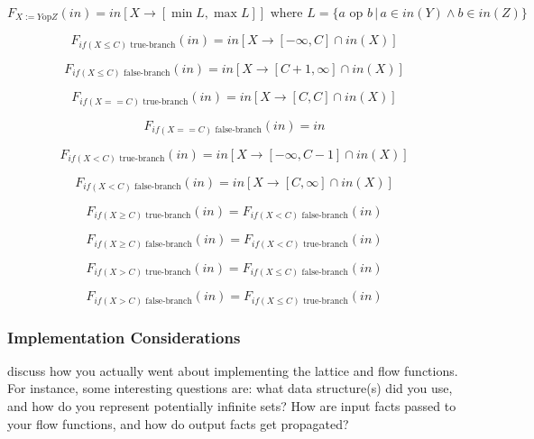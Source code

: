 \documentclass{article}
\theoremstyle{definition}
\begin{document}
\[ F_{X:= Y \text{op} Z}(in) = in[X \rightarrow [\min L, \max L]]\text{ where } L = \{ a \text{ op } b \, | \, a \in in(Y) \wedge b \in in(Z)  \}\]

\[ F_{if( X \leq C) \text{ true-branch}}(in) = in[X \rightarrow [-\infty, C] \cap in(X)  ] \]

\[ F_{if( X \leq C) \text{ false-branch}}(in) = in[X \rightarrow [C + 1, \infty] \cap in(X)  ]\]

\[ F_{if( X == C) \text{ true-branch}}(in) = in[X \rightarrow [C, C] \cap in(X)  ]\]

\[ F_{if( X == C) \text{ false-branch}}(in) = in \]

\[ F_{if( X < C) \text{ true-branch}}(in) =in[X \rightarrow [-\infty, C -1] \cap in(X)  ] \]

\[ F_{if( X < C) \text{ false-branch}}(in) =  in[X \rightarrow [C, \infty] \cap in(X)  ]\]

\[ F_{if( X \geq C) \text{ true-branch}}(in) =  F_{if( X < C) \text{ false-branch}}(in) \]

\[ F_{if( X \geq C) \text{ false-branch}}(in) =  F_{if( X < C) \text{ true-branch}}(in)\]

\[ F_{if( X > C) \text{ true-branch}}(in) =   F_{if( X \leq C) \text{ false-branch}}(in)\]

\[ F_{if( X > C) \text{ false-branch}}(in) =   F_{if( X \leq C) \text{ true-branch}}(in)\]



\subsubsection{Implementation Considerations}
\begin{framed}
  discuss how you actually went about implementing the lattice and
  flow functions. For instance, some interesting questions are: what
  data structure(s) did you use, and how do you represent potentially
  infinite sets? How are input facts passed to your flow functions,
  and how do output facts get propagated?
\end{framed}
\end{document}

